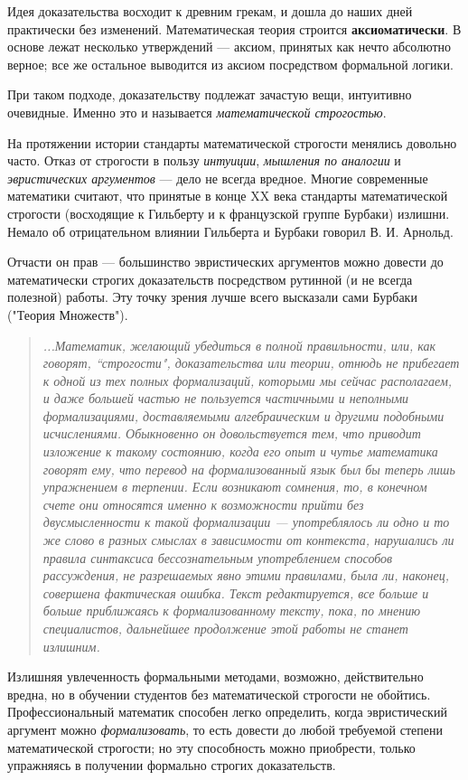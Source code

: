 \documentclass[12pt]{book}
\theoremstyle{upshape}
\theoremstyle{generic}
\def\еза{\end{remark}}
\theoremstyle{upshapenonumber}
\newcommand{\следствие}{%
     \refstepcounter{teorema}
     {\noindent\bf Следствие \thechapter.\arabic{teorema}:\ }}
\newcommand{\пример}{%
     \refstepcounter{teorema}
     {\noindent\bf Пример \thechapter.\arabic{teorema}:\ }}
\newcommand{\лемма}{%
     \refstepcounter{teorema}
     {\noindent\bf Лемма \thechapter.\arabic{teorema}:\ }}
\newcommand{\теорема}{%
     \refstepcounter{teorema}
     {\noindent\bf Теорема \thechapter.\arabic{teorema}:\ }}
\newcommand{\утверждение}{%
     \refstepcounter{teorema}
     {\noindent\bf Утверждение \thechapter.\arabic{teorema}:\ }}
\def\ем{\em}
\def\ез{\end{zadacha}}
\def\еу{\end{ukazanie}}
\def\ео{\end{opredelenie}}
\def\енум{\begin{enumerate}}
\def\ее{\end{enumerate}}
\begin{document}
Идея доказательства восходит к древним грекам,
и дошла до наших дней практически без изменений.
Математическая теория строится {\bf аксиоматически}.
В основе лежат несколько утверждений --- аксиом, принятых 
как нечто абсолютно верное; все же остальное выводится 
из аксиом посредством формальной логики. 

При таком подходе, доказательству подлежат зачастую 
вещи, интуитивно очевидные. Именно это и называется 
{\em математической строгостью}.

На протяжении истории стандарты математической
строгости менялись довольно часто. Отказ от строгости
в пользу {\em интуиции}, {\em мышления по аналогии} и 
{\em эвристических
аргументов} --- дело не всегда вредное.
Многие современные математики считают, что 
принятые в конце XX века стандарты математической
строгости (восходящие к Гильберту и к французской группе 
Бурбаки) излишни. Немало об отрицательном
влиянии Гильберта и Бурбаки говорил 
В. И. Арнольд.

Отчасти он прав --- большинство эвристических
аргументов можно довести до математически
строгих доказательств посредством рутинной
(и не всегда полезной) работы. Эту точку зрения
лучше всего высказали сами Бурбаки ("Теория Множеств"). 

\begin{quote}
{\it ...Математик, желающий убедиться в полной правильности,
или, как говорят, ``строгости", доказательства или теории,
отнюдь не прибегает к одной из тех полных формализаций,
которыми мы сейчас располагаем, и даже большей частью
не пользуется частичными и неполными формализациями,
доставляемыми алгебраическим и другими подобными
исчислениями. Обыкновенно он довольствуется тем, что
приводит изложение к такому состоянию, когда его опыт
и чутье математика  говорят ему, что перевод на
формализованный язык был бы теперь лишь упражнением в
терпении. Если возникают сомнения, то, в конечном счете
они относятся именно к возможности прийти без
двусмысленности к такой формализации ---  употреблялось ли
одно и то же слово в разных смыслах в зависимости от
контекста, нарушались ли правила синтаксиса
бессознательным употреблением способов рассуждения, не
разрешаемых явно этими правилами, была ли, наконец,
совершена фактическая ошибка. Текст редактируется, все
больше и больше приближаясь к формализованному тексту,
пока, по мнению специалистов, дальнейшее продолжение этой
работы не станет излишним.}
\end{quote}


Излишняя увлеченность формальными методами, 
возможно, действительно вредна, но
в обучении студентов без математической строгости не
обойтись. Профессиональный математик способен легко
определить, когда эвристический аргумент можно
{\ем формализовать}, то есть довести до любой требуемой степени
математической строгости; но эту способность можно
приобрести, только упражняясь в получении 
формально строгих доказательств.
\end{document}
